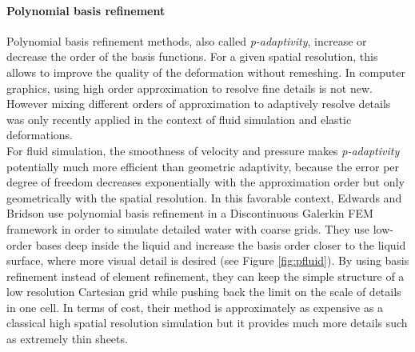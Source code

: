\paragraph*{Polynomial basis refinement}
Polynomial basis refinement methods, also called \emph{p-adaptivity}, increase or decrease the order of the basis functions.
For a given spatial resolution, this allows to improve the quality of the deformation without remeshing. In computer graphics, using high order approximation to resolve fine details is not new. However mixing different orders of approximation to adaptively resolve details was only recently applied in the context of fluid simulation and elastic deformations.
\\
For fluid simulation, the smoothness of velocity and pressure makes \emph{p-adaptivity} potentially much more efficient than geometric adaptivity, because the error per degree of freedom decreases exponentially with the approximation order but only geometrically with the spatial resolution. In this favorable context, Edwards and Bridson \cite{Edwards2012,Edwards2014} use polynomial basis refinement in a Discontinuous Galerkin FEM framework in order to simulate detailed water with coarse grids. They use low-order bases deep inside the liquid and increase the basis order closer to the liquid surface, where more visual detail is desired (see Figure \ref{fig:pfluid}). By using basis refinement instead of element refinement, they can keep the simple structure of a low resolution Cartesian grid while pushing back the limit on the scale of details in one cell. In terms of cost, their method is approximately as expensive as a classical high spatial resolution simulation but it provides much more details such as extremely thin sheets.
